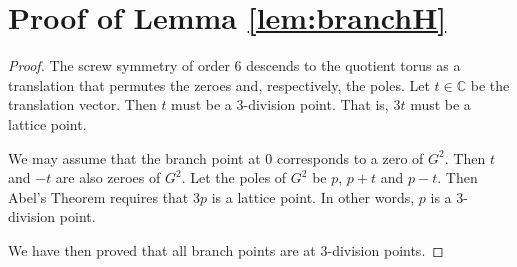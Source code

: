 \documentclass[a4paper]{amsart}
\newcommand{\C}{\mathbb{C}}
\theoremstyle{plain}
\theoremstyle{definition}
\begin{document}
  \section{Proof of Lemma \ref{lem:branchH}\label{proof-of-lem:branchH}}
	\begin{proof}
		The screw symmetry of order $6$ descends to the quotient torus as a
		translation that permutes the zeroes and, respectively, the poles.  Let $t \in
		\C$ be the translation vector.  Then $t$ must be a 3-division point.  That
		is, $3t$ must be a lattice point.

		We may assume that the branch point at $0$ corresponds to a zero of $G^2$.
		Then $t$ and $-t$ are also zeroes of $G^2$.  Let the poles of $G^2$ be $p$,
		$p+t$ and $p-t$.  Then Abel's Theorem requires that $3p$ is a lattice point.
		In other words, $p$ is a 3-division point.

		We have then proved that all branch points are at 3-division points.
	\end{proof}
\end{document}
